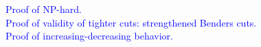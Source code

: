 \documentclass[11pt]{article}
\begin{document}
	\textcolor{blue}{
		Proof of NP-hard.\\
		Proof of validity of tighter cuts: strengthened Benders cuts.\\
		Proof of increasing-decreasing behavior.
	}

\end{document}
